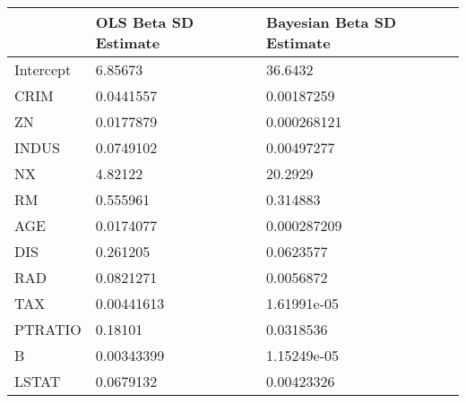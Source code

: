 \begin{tabular}{lll}
\hline
           & OLS Beta SD Estimate   & Bayesian Beta SD Estimate   \\
\hline
 Intercept & 6.85673                & 36.6432                     \\
 CRIM      & 0.0441557              & 0.00187259                  \\
 ZN        & 0.0177879              & 0.000268121                 \\
 INDUS     & 0.0749102              & 0.00497277                  \\
 NX        & 4.82122                & 20.2929                     \\
 RM        & 0.555961               & 0.314883                    \\
 AGE       & 0.0174077              & 0.000287209                 \\
 DIS       & 0.261205               & 0.0623577                   \\
 RAD       & 0.0821271              & 0.0056872                   \\
 TAX       & 0.00441613             & 1.61991e-05                 \\
 PTRATIO   & 0.18101                & 0.0318536                   \\
 B         & 0.00343399             & 1.15249e-05                 \\
 LSTAT     & 0.0679132              & 0.00423326                  \\
\hline
\end{tabular}